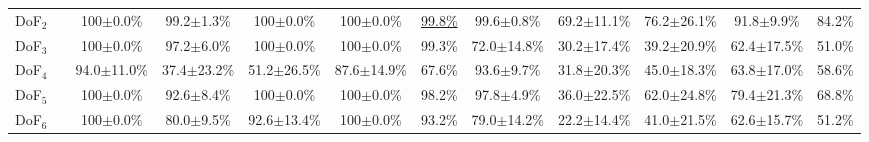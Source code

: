 \begin{table}[htbp]
\begin{adjustbox}{max width=\textwidth,center}
\begin{tabular}{c|c|cccccccccc}
\multicolumn{1}{c|}{DoF$_2$}              &                                     & 100$\pm$0.0\%                           & 99.2$\pm$1.3\%                           & 100$\pm$0.0\%                         & 100$\pm$0.0\%                         & \multicolumn{1}{c|}{\cellcolor{mygray}\underline{99.8\%}}    & 99.6$\pm$0.8\%                             & 69.2$\pm$11.1\%                            & 76.2$\pm$26.1\%                         & 91.8$\pm$9.9\%                          & \cellcolor{mygray} 84.2\%                        \\
\multicolumn{1}{c|}{DoF$_3$}              &                                     & 100$\pm$0.0\%                           & 97.2$\pm$6.0\%                           & 100$\pm$0.0\%                         & 100$\pm$0.0\%                         & \multicolumn{1}{c|}{\cellcolor{mygray}99.3\%}                & 72.0$\pm$14.8\%                            & 30.2$\pm$17.4\%                            & 39.2$\pm$20.9\%                         & 62.4$\pm$17.5\%                         & \cellcolor{mygray} 51.0\%                        \\
\multicolumn{1}{c|}{DoF$_4$}              &                                     & 94.0$\pm$11.0\%                         & 37.4$\pm$23.2\%                          & 51.2$\pm$26.5\%                       & 87.6$\pm$14.9\%                       & \multicolumn{1}{c|}{\cellcolor{mygray}67.6\%}                & 93.6$\pm$9.7\%                             & 31.8$\pm$20.3\%                            & 45.0$\pm$18.3\%                         & 63.8$\pm$17.0\%                         & \cellcolor{mygray} 58.6\%                        \\
\multicolumn{1}{c|}{DoF$_5$}              &                                     & 100$\pm$0.0\%                           & 92.6$\pm$8.4\%                           & 100$\pm$0.0\%                         & 100$\pm$0.0\%                         & \multicolumn{1}{c|}{\cellcolor{mygray}98.2\%}                & 97.8$\pm$4.9\%                             & 36.0$\pm$22.5\%                            & 62.0$\pm$24.8\%                         & 79.4$\pm$21.3\%                         & \cellcolor{mygray} 68.8\%                        \\
\multicolumn{1}{c|}{DoF$_6$}              &                                     & 100$\pm$0.0\%                           & 80.0$\pm$9.5\%                           & 92.6$\pm$13.4\%                       & 100$\pm$0.0\%                         & \multicolumn{1}{c|}{\cellcolor{mygray}93.2\%}                & 79.0$\pm$14.2\%                            & 22.2$\pm$14.4\%                            & 41.0$\pm$21.5\%                         & 62.6$\pm$15.7\%                         & \cellcolor{mygray} 51.2\%                        \\

\end{tabular}
\end{adjustbox}
\end{table}
